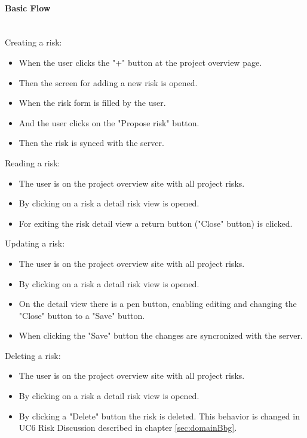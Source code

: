 \paragraph*{Basic Flow} \mbox{}\\
\noindent
Creating a risk:
\begin{itemize}
	\vspace{-3mm}
	\setlength\itemsep{-1.5em}
	\item  When the user clicks the "+" button at the project overview page.
	\item Then the screen for adding a new risk is opened.
	\item When the risk form is filled by the user.
	\item And the user clicks on the "Propose risk" button.
	\item Then the risk is synced with the server.
\end{itemize}

\noindent
Reading a risk:
\begin{itemize}
	\vspace{-3mm}
	\setlength\itemsep{-1em}
	\item The user is on the project overview site with all project risks.
	\item By clicking on a risk a detail risk view is opened.
	\item For exiting the risk detail view a return button ("Close" button) is clicked.
\end{itemize}

\noindent
Updating a risk: 
\begin{itemize}
	\vspace{-3mm}
	\setlength\itemsep{-1em}
	\item The user is on the project overview site with all project risks.
	\item By clicking on a risk a detail risk view is opened.
	\item On the detail view there is a pen button, enabling editing and changing the "Close" button to a "Save" button.
	\item When clicking the "Save" button the changes are syncronized with the server.
\end{itemize} 

\noindent
Deleting a risk:
\begin{itemize}
	\vspace{-3mm}
	\setlength\itemsep{-1em}
	\item The user is on the project overview site with all project risks.
	\item By clicking on a risk a detail risk view is opened.
	\item By clicking a "Delete" button the risk is deleted. This behavior is changed in UC6 Risk Discussion described in chapter \ref{sec:domainBbg}.
\end{itemize}


